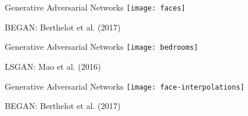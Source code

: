 %
%

\begin{slide}{Generative Adversarial Networks}
  \texttt{[image: faces]}

  \scriptsize
  BEGAN: Berthelot et al. (2017)
\end{slide}

\begin{slide}{Generative Adversarial Networks}
  \texttt{[image: bedrooms]}

  \scriptsize
  LSGAN: Mao et al. (2016)
\end{slide}

\begin{slide}{Generative Adversarial Networks}
  \texttt{[image: face-interpolations]}

  \scriptsize
  BEGAN: Berthelot et al. (2017)
\end{slide}

%
%
